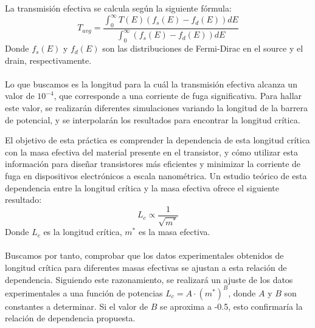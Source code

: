 La transmisión efectiva se calcula según la siguiente fórmula:
\begin{equation}
    \label{eq:teff}
    T_{avg} = \frac{\int_{0}^{\infty} T(E) (f_s(E) - f_d(E)) dE}{\int_{0}^{\infty} (f_s(E) - f_d(E)) dE}
\end{equation}
Donde $f_s(E)$ y $f_d(E)$ son las distribuciones de Fermi-Dirac en el source y el drain, respectivamente.
\paragraph{}
Lo que buscamos es la longitud para la cuál la transmisión efectiva alcanza un valor de $10^{-4}$, que corresponde a una corriente de fuga significativa\cite{pengTwoDimensionalMX2Semiconductors2018}.
Para hallar este valor, se realizarán diferentes simulaciones variando la longitud de la barrera de potencial, y se interpolarán los resultados para encontrar la longitud crítica.

El objetivo de esta práctica es comprender la dependencia de esta longitud crítica con la masa efectiva del material presente en el transistor, y cómo utilizar esta
información para diseñar transistores más eficientes y minimizar la corriente de fuga en dispositivos electrónicos a escala nanométrica.
Un estudio teórico de esta dependencia entre la longitud crítica y la masa efectiva ofrece el siguiente resultado:
\begin{equation}
    \label{eq:lym*}
    L_c\propto \frac{1}{\sqrt{m^*}}
\end{equation}
Donde $L_c$ es la longitud crítica, $m^*$ es la masa efectiva.\\ 
\paragraph{}
Buscamos por tanto, comprobar que los datos experimentales obtenidos de longitud crítica para diferentes masas efectivas se ajustan a esta relación de dependencia.
Siguiendo este razonamiento, se realizará un ajuste de los datos experimentales a una función de potencias $L_c = A \cdot (m^*)^B$, donde $A$ y $B$ son constantes a determinar. Si el valor de $B$ se aproxima a -0.5, esto confirmaría la relación de dependencia propuesta.
